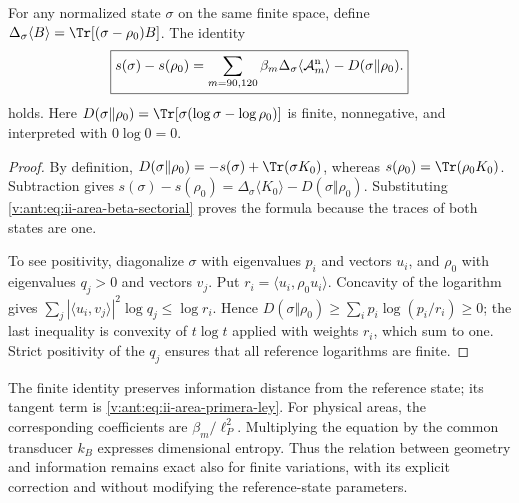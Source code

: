 \begin{theorem}
\label{v:ant:thm:ii-area-ley-finita}
For any normalized state \(\sigma\) on the same finite space,
define \(\Delta_\sigma\langle B\rangle
=\Tr[(\sigma-\rho_0)B]\). The identity
\begin{equation}
 \boxed{
 s(\sigma)-s(\rho_0)
 =\sum_{m=90,120}\beta_m
      \Delta_\sigma\langle\mathcal A_m^{\rm n}\rangle
   -D(\sigma\Vert\rho_0).}
 \label{v:ant:eq:ii-area-ley-finita}
\end{equation}
holds.
Here \(D(\sigma\Vert\rho_0)=\Tr[\sigma(\log\sigma-\log\rho_0)]\)
is finite, nonnegative, and interpreted with \(0\log0=0\).
\end{theorem}
\begin{proof}
By definition,
\(D(\sigma\Vert\rho_0)=-s(\sigma)+\Tr(\sigma K_0)\), whereas
\(s(\rho_0)=\Tr(\rho_0K_0)\). Subtraction gives
\(s(\sigma)-s(\rho_0)=\Delta_\sigma\langle K_0\rangle
-D(\sigma\Vert\rho_0)\). Substituting
\eqref{v:ant:eq:ii-area-beta-sectorial} proves the formula because the
traces of both states are one.

To see positivity, diagonalize \(\sigma\) with eigenvalues
\(p_i\) and vectors \(u_i\), and \(\rho_0\) with eigenvalues
\(q_j>0\) and vectors \(v_j\). Put
\(r_i=\langle u_i,\rho_0u_i\rangle\). Concavity of the logarithm
gives
\(\sum_j|\langle u_i,v_j\rangle|^2\log q_j\le\log r_i\).
Hence
\(D(\sigma\Vert\rho_0)\ge\sum_i p_i\log(p_i/r_i)\ge0\);
the last inequality is convexity of \(t\log t\) applied
with weights \(r_i\), which sum to one. Strict positivity of the
\(q_j\) ensures that all reference logarithms are finite.
\end{proof}

The finite identity preserves information distance from the
reference state; its tangent term is
\eqref{v:ant:eq:ii-area-primera-ley}. For physical areas, the
corresponding coefficients are \(\beta_m/\ell_P^2\).
Multiplying the equation by the common transducer \(k_B\) expresses
dimensional entropy. Thus the relation between geometry and information
remains exact also for finite variations, with its explicit
correction and without modifying the reference-state parameters.
